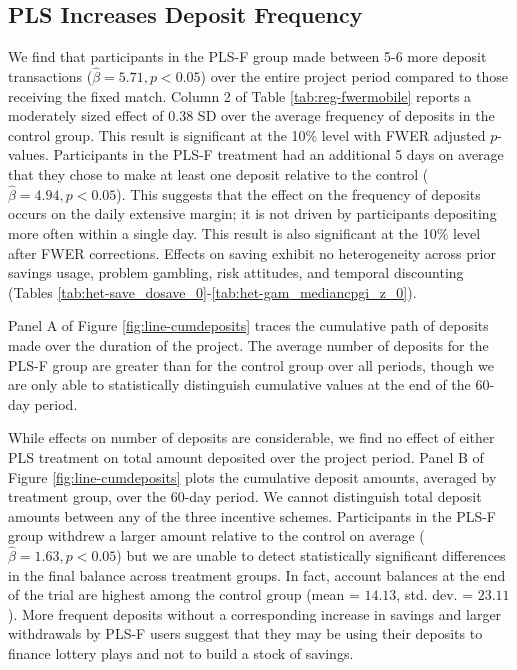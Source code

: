 \documentclass[12pt, titlepage]{article}
\begin{document}
	\subsection{PLS Increases Deposit Frequency}

		We find that participants in the PLS-F group made between 5-6 more deposit transactions ($\hat \beta = 5.71, p < 0.05$) over the entire project period compared to those receiving the fixed match. Column 2 of Table \ref{tab:reg-fwermobile} reports a moderately sized effect of 0.38 SD over the average frequency of deposits in the control group. This result is significant at the 10\% level with FWER adjusted $p$-values. Participants in the PLS-F treatment had an additional 5 days on average that they chose to make at least one deposit relative to the control ($\hat \beta = 4.94, p < 0.05$). This suggests that the effect on the frequency of deposits occurs on the daily extensive margin; it is not driven by participants depositing more often within a single day. This result is also significant at the 10\% level after FWER corrections. Effects on saving exhibit no heterogeneity across prior savings usage, problem gambling, risk attitudes, and temporal discounting (Tables \ref{tab:het-save_dosave_0}-\ref{tab:het-gam_mediancpgi_z_0}).

		Panel A of Figure \ref{fig:line-cumdeposits} traces the cumulative path of deposits made over the duration of the project. The average number of deposits for the PLS-F group are greater than for the control group over all periods, though we are only able to statistically distinguish cumulative values at the end of the 60-day period.

		While effects on number of deposits are considerable, we find no effect of either PLS treatment on total amount deposited over the project period. Panel B of Figure \ref{fig:line-cumdeposits} plots the cumulative deposit amounts, averaged by treatment group, over the 60-day period. We cannot distinguish total deposit amounts between any of the three incentive schemes. Participants in the PLS-F group withdrew a larger amount relative to the control on average ($\hat \beta = 1.63, p < 0.05$) but we are unable to detect statistically significant differences in the final balance across treatment groups. In fact, account balances at the end of the trial are highest among the control group (mean = $14.13$, std. dev. = $23.11$). More frequent deposits without a corresponding increase in savings and larger withdrawals by PLS-F users suggest that they may be using their deposits to finance lottery plays and not to build a stock of savings.
\end{document}
